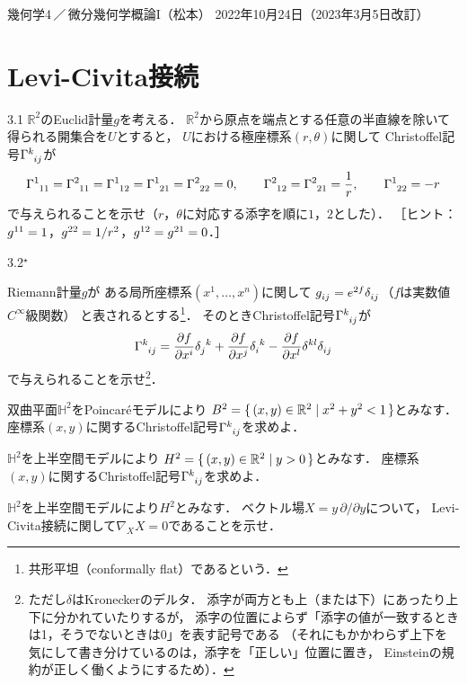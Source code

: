 \documentclass[uplatex,dvipdfmx,fontsize=12pt,jafontsize=11pt,line_length=42zw,number_of_lines=36,hanging_punctuation]{jlreq}
\begin{document}
\begin{flushleft}
	幾何学4\,／\,微分幾何学概論I（松本）
	\hfill
	2022年10月24日（2023年3月5日改訂）
\end{flushleft}
\setcounter{section}{2}
\section{Levi-Civita接続}

\begin{problems}
	\item[3.1]
		$\mathbb{R}^2$のEuclid計量$g$を考える．
		$\mathbb{R}^2$から原点を端点とする任意の半直線を除いて得られる開集合を$U$とすると，
		$U$における極座標系$(r,\theta)$に関して
		Christoffel記号$\tensor{\Gamma}{^k_i_j}$が
		\begin{equation}
			\tensor{\Gamma}{^1_1_1}
			=\tensor{\Gamma}{^2_1_1}
			=\tensor{\Gamma}{^1_1_2}
			=\tensor{\Gamma}{^1_2_1}
			=\tensor{\Gamma}{^2_2_2}=0,\qquad
			\tensor{\Gamma}{^2_1_2}
			=\tensor{\Gamma}{^2_2_1}=\frac{1}{r},\qquad
			\tensor{\Gamma}{^1_2_2}=-r
		\end{equation}
		で与えられることを示せ（$r$，$\theta$に対応する添字を順に$1$，$2$とした）．
		［ヒント：$\tensor{g}{^1^1}=1$，$\tensor{g}{^2^2}=1/r^2$，$\tensor{g}{^1^2}=\tensor{g}{^2^1}=0$．］
	\item[3.2$^\star$]\phantom{}
		\begin{subproblems}\vspace{-\baselineskip}
			\item
				Riemann計量$g$が
				ある局所座標系$(x^1,\dots,x^n)$に関して
				$\tensor{g}{_i_j}=e^{2f}\tensor{\delta}{_i_j}$（$f$は実数値$C^\infty$級関数）
				と表されるとする\footnote{共形平坦（conformally flat）であるという．}．
				そのときChristoffel記号$\tensor{\Gamma}{^k_i_j}$が
				\begin{equation}
					\tensor{\Gamma}{^k_i_j}
					=\frac{\partial f}{\partial x^i}\tensor{\delta}{_j^k}
					+\frac{\partial f}{\partial x^j}\tensor{\delta}{_i^k}
					-\frac{\partial f}{\partial x^l}\tensor{\delta}{^k^l}\tensor{\delta}{_i_j}
				\end{equation}
				で与えられることを示せ\footnote{ただし$\delta$はKroneckerのデルタ．
				添字が両方とも上（または下）にあったり上下に分かれていたりするが，
				添字の位置によらず「添字の値が一致するときは1，そうでないときは0」を表す記号である
				（それにもかかわらず上下を気にして書き分けているのは，添字を「正しい」位置に置き，
				Einsteinの規約が正しく働くようにするため）．}．
			\item
				双曲平面$\mathbb{H}^2$をPoincar\'eモデルにより
				$B^2=\set{(x,y)\in\mathbb{R}^2|x^2+y^2<1}$とみなす．
				座標系$(x,y)$に関するChristoffel記号$\tensor{\Gamma}{^k_i_j}$を求めよ．
			\item
				$\mathbb{H}^2$を上半空間モデルにより
				$H^2=\set{(x,y)\in\mathbb{R}^2|y>0}$とみなす．
				座標系$(x,y)$に関するChristoffel記号$\tensor{\Gamma}{^k_i_j}$を求めよ．
			\item
				$\mathbb{H}^2$を上半空間モデルにより$H^2$とみなす．
				ベクトル場$X=y\,\partial/\partial y$について，
				Levi-Civita接続に関して$\nabla_XX=0$であることを示せ．
		\end{subproblems}
\end{problems}
\end{document}
